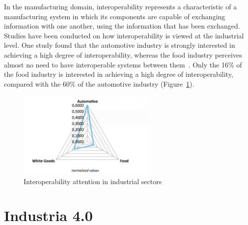 In the manufacturing domain, interoperability represents a characteristic of a manufacturing system in which its components are capable of exchanging information with one another, using the information that has been exchanged.
Studies have been conducted on how interoperability is viewed at the industrial level. One study found that the automotive industry is strongly interested in achieving a high degree of interoperability, whereas the food industry perceives almost no need to have interoperable systems between them~\cite{LIAO201712434}. Only the 16\% of the food industry is interested in achieving a high degree of interoperability, compared with the 60\% of the automotive industry (Figure~\ref{fig:interoperability}).

\begin{figure}[h]
	\centering
	\includegraphics[width=0.6\textwidth]{img/interoperability.png}
	\caption{Interoperability attention in industrial sectors}
	\label{fig:interoperability}
\end{figure}

\section{Industria 4.0}
